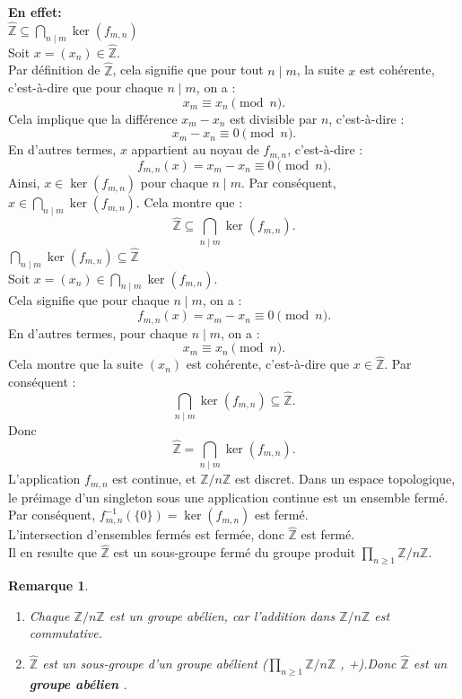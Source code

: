 \documentclass[a4paper, 14pt]{report}
\newtheorem{remark}{Remarque}[section]
\begin{document}
\begin{onehalfspace}
{			\textbf{En effet:}\\
			\( \widehat{\mathbb{Z}} \subseteq \bigcap_{n \mid m} \ker(f_{m,n}) \) \\
			Soit \( x = (x_n) \in \widehat{\mathbb{Z}} \).\\
			Par définition de \( \widehat{\mathbb{Z}} \), cela signifie que pour tout \( n \mid m \), la suite \( x \) est cohérente, c'est-à-dire que pour chaque \( n \mid m \), on a :
			\[
			x_m \equiv x_n \pmod{n}.
			\]
			Cela implique que la différence \( x_m - x_n \) est divisible par \( n \), c'est-à-dire :
			\[
			x_m - x_n \equiv 0 \pmod{n}.
			\]
			En d'autres termes, \( x \) appartient au noyau de \( f_{m,n} \), c'est-à-dire :
			\[
			f_{m,n}(x) = x_m - x_n \equiv 0 \pmod{n}.
			\]
			Ainsi, \( x \in \ker(f_{m,n}) \) pour chaque \( n \mid m \). Par conséquent, \( x \in \bigcap_{n \mid m} \ker(f_{m,n}) \). Cela montre que :
			\[
			\widehat{\mathbb{Z}} \subseteq \bigcap_{n \mid m} \ker(f_{m,n}).
			\]
			\( \bigcap_{n \mid m} \ker(f_{m,n}) \subseteq \widehat{\mathbb{Z}} \) \\
			Soit \( x = (x_n) \in \bigcap_{n \mid m} \ker(f_{m,n}) \).\\
			Cela signifie que pour chaque \( n \mid m \), on a :
			\[
			f_{m,n}(x) = x_m - x_n \equiv 0 \pmod{n}.
			\]
			En d'autres termes, pour chaque \( n \mid m \), on a :
			\[
			x_m \equiv x_n \pmod{n}.
			\]
			Cela montre que la suite \( (x_n) \) est cohérente, c'est-à-dire que \( x \in \widehat{\mathbb{Z}} \). Par conséquent :
			\[
			\bigcap_{n \mid m} \ker(f_{m,n}) \subseteq \widehat{\mathbb{Z}}.
			\]
			Donc 
			\[
			\widehat{\mathbb{Z}} = \bigcap_{n \mid m} \ker(f_{m,n}).
			\]
			L'application \(f_{m,n}\) est continue, et \(\mathbb{Z}/n\mathbb{Z}\) est discret. Dans un espace topologique, le préimage d'un singleton sous une application continue est un ensemble fermé. Par conséquent, \(f_{m,n}^{-1}(\{0\}) = \ker(f_{m,n})\) est fermé.\\
			L'intersection d'ensembles fermés est fermée, donc \( \widehat{\mathbb{Z}} \) est fermé.\\
			Il en resulte que \( \widehat{\mathbb{Z}} \) est un sous-groupe fermé du groupe produit \(\prod_{n \geq 1} \mathbb{Z}/n\mathbb{Z}\).
			
			\begin{remark}
				\begin{enumerate} [label=\roman*)] \
					\item Chaque \( \mathbb{Z}/n\mathbb{Z} \) est un groupe abélien, car l'addition dans \( \mathbb{Z}/n\mathbb{Z} \) est commutative.
					\item \( \widehat{\mathbb{Z}} \) est un sous-groupe d'un groupe abélient (\(\prod_{n \geq 1} \mathbb{Z}/n\mathbb{Z}\) , +).Donc \( \widehat{\mathbb{Z}} \) est un \textbf{groupe abélien} \cite{schaub1997}.
				\end{enumerate}
			\end{remark}
			
}
\end{onehalfspace}
\end{document}

